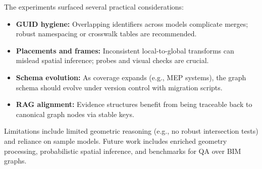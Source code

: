 The experiments surfaced several practical considerations:

\begin{itemize}[leftmargin=*]
  \item \textbf{GUID hygiene:} Overlapping identifiers across models complicate merges; robust namespacing or crosswalk tables are recommended.
  \item \textbf{Placements and frames:} Inconsistent local-to-global transforms can mislead spatial inference; probes and visual checks are crucial.
  \item \textbf{Schema evolution:} As coverage expands (e.g., MEP systems), the graph schema should evolve under version control with migration scripts.
  \item \textbf{RAG alignment:} Evidence structures benefit from being traceable back to canonical graph nodes via stable keys.
\end{itemize}

Limitations include limited geometric reasoning (e.g., no robust intersection tests) and reliance on sample models. Future work includes enriched geometry processing, probabilistic spatial inference, and benchmarks for QA over BIM graphs.

